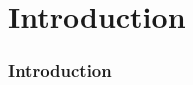 \documentclass{beamer}
\begin{document}
  \section{Introduction}
  \frame
  {
    \frametitle{Introduction}

    \centerline{}
  }
    \frame
\end{document}
